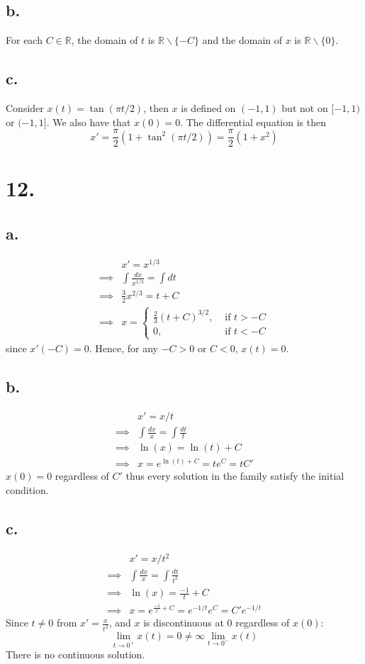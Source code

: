 \documentclass[11pt]{article}
\theoremstyle{mystyle}
\theoremstyle{definition}
\begin{document}
\subsection*{b.}
For each $C \in \mathbb{R}$, the domain of $t$ is $\mathbb{R} \backslash \{-C\}$
and the domain of $x$ is $\mathbb{R} \backslash \{0\}$. 
\subsection*{c.}
Consider $x(t) = \tan(\pi t /2)$, then $x$ is defined on $(-1,1)$ but not on $[-1,1)$ or $(-1,1]$. We also have that $x(0) = 0$. The differential equation is then 
\[
  x' = \displaystyle\frac{\pi}{2} (1 + \tan^2(\pi t /2)) = \displaystyle\frac{\pi}{2} (1 + x^2)
\]
\pagebreak
\section*{12.}
\subsection*{a.}
\begin{align*}
  &x' = x^{1/3} \\
  \implies & \int \displaystyle\frac{dx}{x^{1/3}} = \int dt \\
  \implies & \displaystyle\frac{3}{2}x^{2/3} = t + C \\
  \implies & x = 
  \begin{cases}
    \displaystyle\frac{2}{3}\left(t+C \right)^{3/2}, &\text{ if } t > -C \\
    0, &\text{ if } t < -C
  \end{cases}
\end{align*}
since $x'(-C) = 0$. Hence, for any $-C>0$ or $C < 0$, $x(t) =  0$. 
\subsection*{b.}
\begin{align*}
  &x' = x /t \\
  \implies & \int \displaystyle\frac{dx}{x} = \int \displaystyle\frac{dt}{t} \\
  \implies & \ln(x) = \ln(t) + C \\
  \implies & x = e^{\ln(t) + C} = te^C = tC'
\end{align*}
$x(0) = 0$ regardless of $C'$ thus every solution in the family satisfy the initial condition.
\subsection*{c.}
\begin{align*}
  &x' = x /t^2 \\
  \implies & \int \displaystyle\frac{dx}{x} = \int \displaystyle\frac{dt}{t^2} \\
  \implies & \ln(x) = \frac{-1}{t} + C \\
  \implies & x = e^{\frac{-1}{t} + C} = e^{-1/t} e^C = C' e^{-1/t}
\end{align*}
Since $t\ne 0$ from $x' = \displaystyle\frac{x}{t^2}$, and $x$ is discontinuous at $0$ regardless of $x(0)$:
\[
  \lim_{t\to 0^+} x(t) = 0 \ne \infty \lim_{t \to 0^-} x(t)
\]
There is no continuous solution.  
\pagebreak
\end{document}
